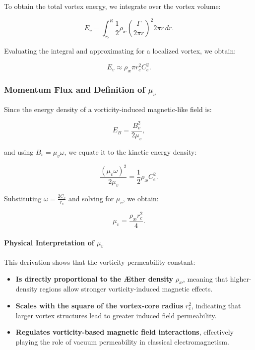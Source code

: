 \documentclass[a4paper,10pt]{article}
\begin{document}
To obtain the total vortex energy, we integrate over the vortex volume:

\begin{equation*}
    E_v = \int_{r_c}^{R} \frac{1}{2} \rho_\text{\ae} \left( \frac{\Gamma}{2\pi r} \right)^2 2\pi r \, dr.
\end{equation*}

Evaluating the integral and approximating for a localized vortex, we obtain:

\begin{equation*}
    E_v \approx \rho_\text{\ae} \pi r_c^2 C_e^2.
\end{equation*}

\subsubsection*{Momentum Flux and Definition of \( \mu_v \)}
Since the energy density of a vorticity-induced magnetic-like field is:

\begin{equation*}
    E_B = \frac{B_v^2}{2\mu_v},
\end{equation*}

and using \( B_v = \mu_v \omega \), we equate it to the kinetic energy density:

\begin{equation*}
    \frac{(\mu_v \omega)^2}{2\mu_v} = \frac{1}{2} \rho_\text{\ae} C_e^2.
\end{equation*}

Substituting \( \omega = \frac{2C_e}{r_c} \) and solving for \( \mu_v \), we obtain:

\begin{equation*}
    \mu_v = \frac{\rho_\text{\ae} r_c^2}{4}.
\end{equation*}

\paragraph*{Physical Interpretation of \( \mu_v \)}
This derivation shows that the vorticity permeability constant:

\begin{itemize}
    \item \textbf{Is directly proportional to the Æther density} \( \rho_\text{\ae} \), meaning that higher-density regions allow stronger vorticity-induced magnetic effects.
    \item \textbf{Scales with the square of the vortex-core radius} \( r_c^2 \), indicating that larger vortex structures lead to greater induced field permeability.
    \item \textbf{Regulates vorticity-based magnetic field interactions}, effectively playing the role of vacuum permeability in classical electromagnetism.
\end{itemize}
\end{document}
